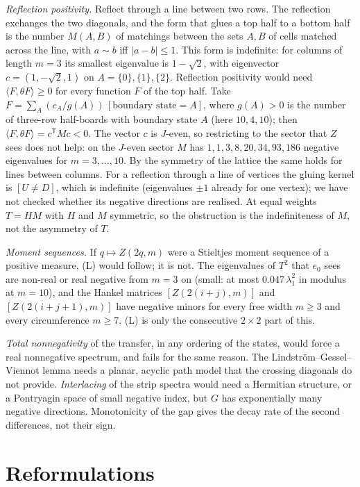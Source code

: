 \documentclass[11pt]{amsart}
\theoremstyle{definition}
\theoremstyle{remark}
\begin{document}
\emph{Reflection positivity.} Reflect through a line between two rows. The reflection exchanges the
two diagonals, and the form that glues a top half to a bottom half is the number $M(A, B)$ of
matchings between the sets $A, B$ of cells matched across the line, with $a \sim b$ iff
$|a - b| \le 1$. This form is indefinite: for columns of length $m = 3$ its smallest eigenvalue is
$1 - \sqrt2$, with eigenvector $c = (1, -\sqrt2, 1)$ on $A = \{0\}, \{1\}, \{2\}$. Reflection
positivity would need $\langle F, \theta F\rangle \ge 0$ for every function $F$ of the top half. Take
$F = \sum_A (c_A / g(A))\,[\text{boundary state} = A]$, where $g(A) > 0$ is the number of three-row
half-boards with boundary state $A$ (here $10, 4, 10$); then $\langle F, \theta F\rangle = c^{\mathsf T}
M c < 0$. The vector $c$ is $J$-even, so restricting to the sector that $Z$ sees does not help: on the
$J$-even sector $M$ has $1, 1, 3, 8, 20, 34, 93, 186$ negative eigenvalues for $m = 3, \dots, 10$. By
the symmetry of the lattice the same holds for lines between columns. For a reflection through a line
of vertices the gluing kernel is $[U \ne D]$, which is indefinite (eigenvalues $\pm1$ already for
one vertex); we have not checked whether its negative directions are realised. At equal weights
$T = HM$ with $H$ and $M$ symmetric, so the obstruction is the indefiniteness of $M$, not the
asymmetry of $T$.

\emph{Moment sequences.} If $q \mapsto Z(2q, m)$ were a Stieltjes moment sequence of a positive
measure, (L) would follow; it is not. The eigenvalues of $T^2$ that $e_0$ sees are non-real or real
negative from $m = 3$ on (small: at most $0.047\,\lambda_1^2$ in modulus at $m = 10$), and the
Hankel matrices $[Z(2(i+j), m)]$ and $[Z(2(i+j+1), m)]$ have negative minors for every free width
$m \ge 3$ and every circumference $m \ge 7$. (L) is only the consecutive $2 \times 2$ part of this.

\emph{Total nonnegativity} of the transfer, in any ordering of the states, would force a real
nonnegative spectrum, and fails for the same reason. The
Lindstr\"om--Gessel--Viennot lemma needs a planar, acyclic path model that the crossing diagonals do
not provide. \emph{Interlacing} of the strip spectra would need a Hermitian structure, or a
Pontryagin space of small negative index, but $G$ has exponentially many negative directions.
Monotonicity of the gap gives the decay rate of the second differences, not their sign.

\section{Reformulations}\label{sec:reform}
\end{document}
